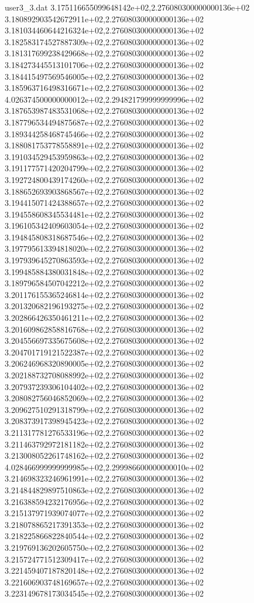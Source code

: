 \begin{filecontents}{user3_3.dat}
3.175116655099648142e+02,2.276080300000000136e+02
3.180892903542672911e+02,2.276080300000000136e+02
3.181034460644216324e+02,2.276080300000000136e+02
3.182583174527887309e+02,2.276080300000000136e+02
3.181317699238429668e+02,2.276080300000000136e+02
3.184273445513101706e+02,2.276080300000000136e+02
3.184415497569546005e+02,2.276080300000000136e+02
3.185963716498316671e+02,2.276080300000000136e+02
4.026374500000000012e+02,2.294821799999999996e+02
3.187653987483531068e+02,2.276080300000000136e+02
3.187796534494875687e+02,2.276080300000000136e+02
3.189344258468745466e+02,2.276080300000000136e+02
3.188081753778558891e+02,2.276080300000000136e+02
3.191034529453959863e+02,2.276080300000000136e+02
3.191177571420204799e+02,2.276080300000000136e+02
3.192724800439174260e+02,2.276080300000000136e+02
3.188652693903868567e+02,2.276080300000000136e+02
3.194415071424388657e+02,2.276080300000000136e+02
3.194558608345534481e+02,2.276080300000000136e+02
3.196105342409603054e+02,2.276080300000000136e+02
3.194845808318687546e+02,2.276080300000000136e+02
3.197795613394818020e+02,2.276080300000000136e+02
3.197939645270863593e+02,2.276080300000000136e+02
3.199485884380031848e+02,2.276080300000000136e+02
3.189796584507042212e+02,2.276080300000000136e+02
3.201176155365246814e+02,2.276080300000000136e+02
3.201320682196193275e+02,2.276080300000000136e+02
3.202866426350461211e+02,2.276080300000000136e+02
3.201609862858816768e+02,2.276080300000000136e+02
3.204556697335675608e+02,2.276080300000000136e+02
3.204701719121522387e+02,2.276080300000000136e+02
3.206246968320890005e+02,2.276080300000000136e+02
3.202188732708088992e+02,2.276080300000000136e+02
3.207937239306104402e+02,2.276080300000000136e+02
3.208082756046852069e+02,2.276080300000000136e+02
3.209627510291318799e+02,2.276080300000000136e+02
3.208373917398945423e+02,2.276080300000000136e+02
3.211317781276533196e+02,2.276080300000000136e+02
3.211463792972181182e+02,2.276080300000000136e+02
3.213008052261748162e+02,2.276080300000000136e+02
4.028466999999999985e+02,2.299986600000000010e+02
3.214698323246961991e+02,2.276080300000000136e+02
3.214844829897510863e+02,2.276080300000000136e+02
3.216388594232176956e+02,2.276080300000000136e+02
3.215137971939074077e+02,2.276080300000000136e+02
3.218078865217391353e+02,2.276080300000000136e+02
3.218225866822840544e+02,2.276080300000000136e+02
3.219769136202605750e+02,2.276080300000000136e+02
3.215724771512309417e+02,2.276080300000000136e+02
3.221459407187820148e+02,2.276080300000000136e+02
3.221606903748169657e+02,2.276080300000000136e+02
3.223149678173034545e+02,2.276080300000000136e+02

\end{filecontents}
